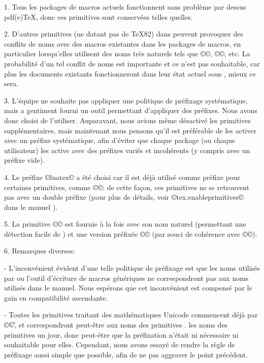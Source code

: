 \documentclass{lltxdoc}
\begin{document}
{1. Tous les packages de macros actuels fonctionnent sans problème par dessus pdf(e)TeX, donc ces primitives sont conservées telles quelles.

2. D'autres primitives (ne datant pas de TeX82) dans \luatex peuvent provoquer des conflits de noms avec des macros existantes dans les packages de macros, en particulier lorsqu'elles utilisent des noms très \og{}naturels\fg{} tels que ©\outputbox©, ©\mathstyle©, etc. La probabilité d'un tel conflit de noms est importante et ce n'est pas souhaitable, car plus les documents \latex existants fonctionneront dans leur état actuel sous \luatex, mieux ce sera.

3. L'équipe \luatex ne souhaite pas appliquer une politique de préfixage systématique, mais a gentiment fourni un outil permettant d'appliquer des préfixes. Nous avons donc choisi de l'utiliser. Auparavant, nous avions même désactivé les primitives supplémentaires, mais maintenant nous pensons qu'il est préférable de les activer avec un préfixe systématique, afin d'éviter que chaque package (ou chaque utilisateur) les active avec des préfixes variés et incohérents (y compris avec un préfixe vide).

4. Le préfixe ©luatex© a été choisi car il est déjà utilisé comme préfixe pour certaines primitives, comme ©\luatexversion©: de cette façon, ces primitives ne se retrouvent pas avec un double préfixe (pour plus de détails, voir ©tex.enableprimitives© dans le manuel \luatex).

5. La primitive ©\directlua© est fournie à la fois avec son nom naturel (permettant une détection facile de \luatex) et une version préfixée ©\luatexdirectlua© (par souci de cohérence avec ©\luatexlatelua©).

6. Remarques diverses:

- L'inconvénient évident d'une telle politique de préfixage est que les noms utilisés par \latex ou l'outil d'écriture de macros génériques ne correspondront pas aux noms utilisés dans le manuel. Nous espérons que cet inconvénient est compensé par le gain en compatibilité ascendante.

- Toutes les primitives traitant des mathématiques Unicode commencent déjà par ©\U©, et correspondront peut-être aux noms des primitives \xetex. les noms des primitives \xetex un jour, donc peut-être que la préfixation n'était ni nécessaire ni souhaitable pour elles. Cependant, nous avons essayé de rendre la règle de préfixage aussi simple que possible, afin de ne pas aggraver le point précédent.

}
\end{document}
